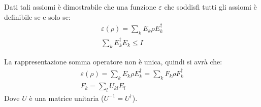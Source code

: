 Dati tali assiomi è dimostrabile che una funzione \(\varepsilon\) che soddisfi tutti gli assiomi è definibile se e solo se:
\begin{gather*}
    \varepsilon(\rho) = \sum_k E_k \rho E_k^\dagger \\ \sum_k E_k^\dagger E_k \le I
\end{gather*}

La rappresentazione somma operatore non è unica, quindi si avrà che:
\begin{gather*}
    \varepsilon(\rho) = \sum_k E_k \rho E_k^\dagger = \sum_k F_k \rho F_k^\dagger\\
    F_k = \sum_l U_{kl} E_l
\end{gather*}
Dove \(U\) è una matrice unitaria (\(U^{-1} = U^\dagger\)).
